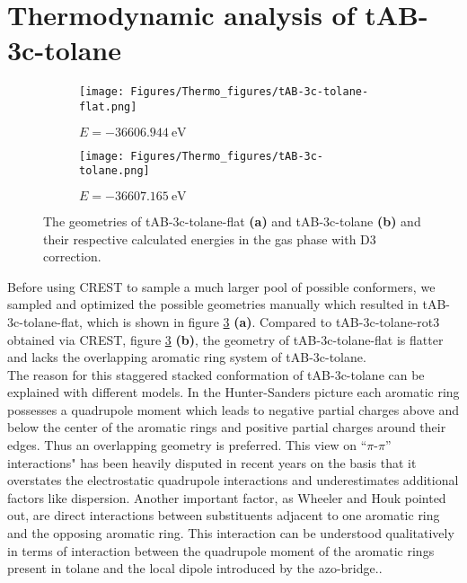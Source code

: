 \section{Thermodynamic analysis of tAB-3c-tolane} \label{sec:thermodyn-analysis}
%
%
\begin{figure}[h]
\centering
\begin{subfigure}{.5\textwidth}
  \centering
  \texttt{[image: Figures/Thermo\_figures/tAB-3c-tolane-flat.png]}
  \caption{$E = \SI{-36606.944}{\eV}$}
  \label{fig:thermo_tAB-3c-tolane-flat}
\end{subfigure}%
\medskip
\begin{subfigure}{.5\textwidth}
  \centering
  \texttt{[image: Figures/Thermo\_figures/tAB-3c-tolane.png]}
  \caption{$E = \SI{-36607.165}{\eV}$}
  \label{fig:thermo_tAB-3c-tolane}
\end{subfigure}
\caption{The geometries of tAB-3c-tolane-flat \textbf{(a)} and tAB-3c-tolane \textbf{(b)} and their respective calculated energies in the gas phase with D3 correction.}
\label{fig:thermo_AB-3c-tolane}
\end{figure}
%
%
%
%
Before using CREST to sample a much larger pool of possible conformers, we sampled and optimized the possible geometries manually which resulted in tAB-3c-tolane-flat, which is shown in figure \ref{fig:thermo_AB-3c-tolane} \textbf{(a)}.
Compared to tAB-3c-tolane-rot3 obtained via CREST, figure \ref{fig:thermo_AB-3c-tolane} \textbf{(b)}, the geometry of tAB-3c-tolane-flat is flatter and lacks the overlapping aromatic ring system of tAB-3c-tolane.
\\
The reason for this staggered stacked conformation of tAB-3c-tolane can be explained with different models. In the Hunter-Sanders picture each aromatic ring possesses a quadrupole moment which leads to negative partial charges above and below the center of the aromatic rings and positive partial charges around their edges.\cite{Hunter-Sanders, Rethinking-pi-pi} Thus an overlapping geometry is preferred. This view on ``$\pi$-$\pi$'' interactions" has been heavily disputed in recent years on the basis that it overstates the electrostatic quadrupole interactions and underestimates additional factors like dispersion.\cite{Rethinking-pi-pi, Reint-pi-stack} Another important factor, as Wheeler and Houk pointed out, are direct interactions between substituents adjacent to one aromatic ring and the opposing aromatic ring.\cite{wheeler-houk} This interaction can be understood qualitatively in terms of interaction between the quadrupole moment of the aromatic rings present in tolane and the local dipole introduced by the azo-bridge.\cite{wheeler-houk}. \\
